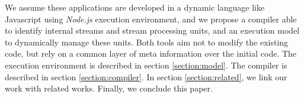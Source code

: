 We assume these applications are developed in a dynamic language like Javascript using \textit{Node.js} execution environment, and we propose a compiler able to identify internal streams and stream processing units, and an execution model to dynamically manage these units.
Both tools aim not to modify the existing code, but rely on a common layer of meta information over the initial code.
The execution environment is described in section \ref{section:model}.
The compiler is described in section \ref{section:compiler}.
In section \ref{section:related}, we link our work with related works.
Finally, we conclude this paper.